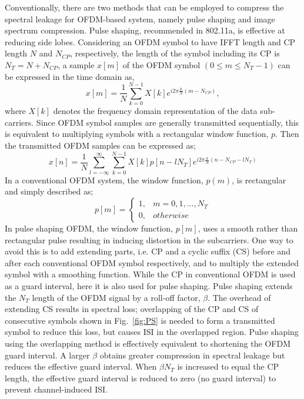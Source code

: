 Conventionally, there are two methods that can be employed to compress the spectral leakage for OFDM-based system, namely pulse shaping and image spectrum compression. Pulse shaping, recommended in 802.11a, is effective at reducing side lobes. 
Considering an OFDM symbol to have IFFT length and CP length $N$ and $N_{CP}$, respectively, the length of the symbol including its CP is $N_{T} = N + N_{CP}$,
a sample $x[m]$ of the OFDM symbol $(0\leq m \leq N_{T}-1)$ can be expressed in the time domain as,
\begin{equation}
\label{xm}
x[m] = \frac{1}{N}\sum_{k=0}^{N-1} X[k] e^{i2\pi\frac{k}{N}(m-N_{CP})},
\end{equation}
where $X[k]$ denotes the frequency domain representation of the data sub-carriers.
Since OFDM symbol samples are generally transmitted sequentially, this is equivalent to multiplying symbols with a rectangular window function, $p$.
Then the transmitted OFDM samples can be expressed as;
\begin{equation}
\label{equ:xn2}
x[n] = \frac{1}{N}\sum_{l=-\infty}^{\infty} \sum_{k=0}^{N-1} X[k] p[n-l N_{T}] e^{i2\pi\frac{k}{N}(n-N_{CP}-l N_{T})}
\end{equation}
In a conventional OFDM system, the window function, $p(m)$, is rectangular and simply described as;
\begin{equation}
\label{equ:pm}
 p[m] =\begin{cases}1, & m = 0,1, ..., N_{T} \\  0, & otherwise \end{cases}
\end{equation}
In pulse shaping OFDM, the window function, $p[m]$, uses a smooth rather than rectangular pulse resulting in inducing distortion in the subcarriers.
One way to avoid this is to add extending parts, i.e. CP and a cyclic suffix (CS) before and after each conventional OFDM symbol respectively, and to multiply the extended symbol with a smoothing function.
While the CP in conventional OFDM is used as a guard interval, here it is also used for pulse shaping. Pulse shaping extends the  $N_{T}$ length of the OFDM signal by a roll-off factor, $\beta$.
The overhead of extending CS results in spectral loss; overlapping of the CP and CS of consecutive symbols shown in Fig.~\ref{fig:PS} is needed to form a transmitted symbol to reduce this loss, but causes ISI in the overlapped region. Pulse shaping using the overlapping method is effectively equivalent to shortening the OFDM guard interval.
A larger $\beta$ obtains greater compression in spectral leakage but reduces the effective guard interval.
When $\beta N_{T}$ is increased to equal the CP length, the effective guard interval is reduced to zero (no guard interval) to prevent channel-induced ISI.

